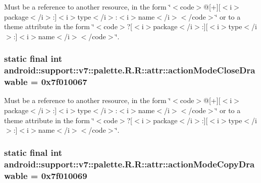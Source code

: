 Must be a reference to another resource, in the form \char`\"{}$<$code$>$@\mbox{[}+\mbox{]}\mbox{[}$<$i$>$package$<$/i$>$:\mbox{]}$<$i$>$type$<$/i$>$:$<$i$>$name$<$/i$>$$<$/code$>$\char`\"{} or to a theme attribute in the form \char`\"{}$<$code$>$?\mbox{[}$<$i$>$package$<$/i$>$:\mbox{]}\mbox{[}$<$i$>$type$<$/i$>$:\mbox{]}$<$i$>$name$<$/i$>$$<$/code$>$\char`\"{}. \hypertarget{classandroid_1_1support_1_1v7_1_1palette_1_1_r_1_1attr_6dec122c349911f480a22800ba5425a3}{
\subsubsection[{actionModeCloseDrawable}]{\setlength{\rightskip}{0pt plus 5cm}static final int android::support::v7::palette.R.R::attr::actionModeCloseDrawable = 0x7f010067}}
\label{classandroid_1_1support_1_1v7_1_1palette_1_1_r_1_1attr_6dec122c349911f480a22800ba5425a3}


Must be a reference to another resource, in the form \char`\"{}$<$code$>$@\mbox{[}+\mbox{]}\mbox{[}$<$i$>$package$<$/i$>$:\mbox{]}$<$i$>$type$<$/i$>$:$<$i$>$name$<$/i$>$$<$/code$>$\char`\"{} or to a theme attribute in the form \char`\"{}$<$code$>$?\mbox{[}$<$i$>$package$<$/i$>$:\mbox{]}\mbox{[}$<$i$>$type$<$/i$>$:\mbox{]}$<$i$>$name$<$/i$>$$<$/code$>$\char`\"{}. \hypertarget{classandroid_1_1support_1_1v7_1_1palette_1_1_r_1_1attr_85a982d6cfcff5b8831fd1db28ba29a3}{
\subsubsection[{actionModeCopyDrawable}]{\setlength{\rightskip}{0pt plus 5cm}static final int android::support::v7::palette.R.R::attr::actionModeCopyDrawable = 0x7f010069}}
\label{classandroid_1_1support_1_1v7_1_1palette_1_1_r_1_1attr_85a982d6cfcff5b8831fd1db28ba29a3}


